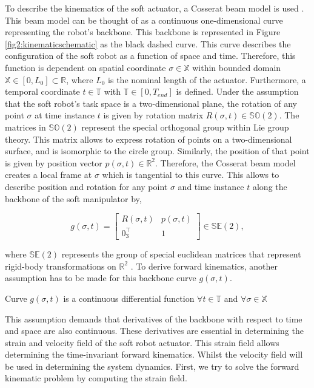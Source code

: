 To describe the kinematics of the soft actuator, a Cosserat beam model is used \cite{Boyer2019}. This beam model can be thought of as a continuous one-dimensional curve representing the robot's backbone. This backbone is represented in Figure \ref{fig2:kinematicschematic} as the black dashed curve. This curve describes the configuration of the soft robot as a function of space and time. Therefore, this function is dependent on spatial coordinate $\sigma \in \mathbb{X}$ within bounded domain $\mathbb{X} \in [0,L_0] \subset \mathbb{R}$, where $L_0$ is the nominal length of the actuator. Furthermore, a temporal coordinate $t \in \mathbb{T}$ with $\mathbb{T} \in [0,T_{end}]$ is defined. Under the assumption that the soft robot's task space is a two-dimensional plane, the rotation of any point $\sigma$ at time instance $t$ is given by rotation matrix $R(\sigma,t) \in \mathbb{SO}(2)$. The matrices in $\mathbb{SO}(2)$ represent the special orthogonal group within Lie group theory. This matrix allows to express rotation of points on a two-dimensional surface, and is isomorphic to the circle group. Similarly, the position of that point is given by position vector $p(\sigma,t) \in \mathbb{R}^2$. Therefore, the Cosserat beam model creates a local frame at $\sigma$ which is tangential to this curve. This allows to describe position and rotation for any point $\sigma$ and time instance $t$ along the backbone of the soft manipulator by,


\begin{equation}
    g(\sigma,t) = \begin{bmatrix}  R(\sigma,t) & p(\sigma,t) \\ 0_3^\top & 1 \end{bmatrix} \in \mathbb{SE}(2),
    \label{eq2:g}
\end{equation}

where $\mathbb{SE}(2)$ represents the group of special euclidean matrices that represent rigid-body transformations on $\mathbb{R}^2$ \cite{Sola2018}. To derive forward kinematics, another assumption has to be made for this backbone curve $g(\sigma,t)$.

\begin{theorem}
Curve  $g(\sigma,t)$ is a continuous differential function $ \forall t \in 
\mathbb{T} $ and $\forall \sigma \in \mathbb{X}$
\end{theorem}

This assumption demands that derivatives of the backbone with respect to time and space are also continuous. These derivatives are essential in determining the strain and velocity field of the soft robot actuator. This strain field allows determining the time-invariant forward kinematics. Whilst the velocity field will be used in determining the system dynamics. First, we try to solve the forward kinematic problem by computing the strain field.



